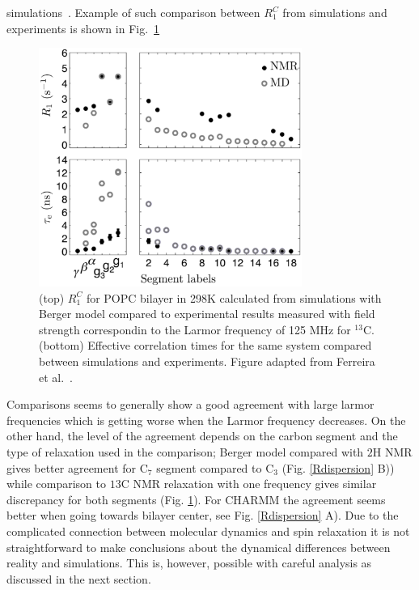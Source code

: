 \documentclass[aps,prl,superscriptaddress,twocolumn]{revtex4}
\begin{document}
simulations~\cite{??}. Example of such comparison between $R_1^{C}$ from simulations and experiments is shown in Fig.~\ref{RandEFFCT}
\begin{figure}[]
  \includegraphics[width=8.6cm]{../Fig/RandEFFCT.eps}
\newline
  \caption{\label{RandEFFCT}
    (top)  $R_1^{C}$ for POPC bilayer in 298K calculated from simulations with Berger model compared to experimental results measured 
    with field strength correspondin to the Larmor frequency of 125 MHz for $^{13}$C.
    (bottom) Effective correlation times for the same system compared between simulations and experiments. 
    Figure adapted from Ferreira et al.~\cite{ferreira15}.
  } 
\end{figure}
Comparisons seems to generally show a good agreement with large larmor frequencies which
is getting worse when the Larmor frequency decreases. On the other hand, the level of the 
agreement depends on the carbon segment and the type of relaxation used in the comparison;
Berger model compared with $2$H NMR gives better agreement for C$_7$ segment compared to
C$_3$ (Fig. \ref{Rdispersion} B)) while comparison to $ 13$C NMR relaxation with one frequency 
gives similar discrepancy for both segments (Fig. \ref{RandEFFCT}). For CHARMM the agreement
seems better when going towards bilayer center, see Fig. \ref{Rdispersion} A).
Due to the complicated connection between molecular dynamics and spin relaxation it
is not straightforward to make conclusions about the dynamical differences between reality
and simulations. This is, however, possible with careful analysis as discussed in the next section.
\end{document}
